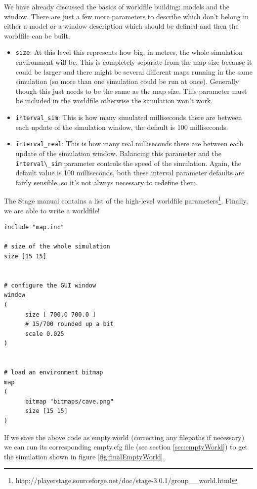 \documentclass[a4paper]{report}
\begin{document}
We have already discussed the basics of worldfile building: models and the window. There are just a few more parameters to describe which don't belong in either a model or a window description which should be defined and then the worldfile can be built.
\begin{itemize}
\item \verb|size|: At this level this represents how big, in metres, the whole simulation environment will be. This is completely separate from the map size because it could be larger and there might be several different maps running in the same simulation (so more than one simulation could be run at once). Generally though this just needs to be the same as the map size. This parameter must be included in the worldfile otherwise the simulation won't work.
\item \verb|interval_sim|: This is how many simulated milliseconds there are between each update of the simulation window, the default is 100 milliseconds.
\item \verb|interval_real|: This is how many real milliseconds there are between each update of the simulation window. Balancing this parameter and the \verb|interval\_sim| parameter controls the speed of the simulation. Again, the default value is 100 milliseconds, both these interval parameter defaults are fairly sensible, so it's not always necessary to redefine them.
\end{itemize}
The Stage manual contains a list of the high-level worldfile parameters\footnote{http://playerstage.sourceforge.net/doc/stage-3.0.1/group\_\_world.html}.\newline
Finally, we are able to write a worldfile!
\begin{verbatim}
include "map.inc"

# size of the whole simulation
size [15 15]


# configure the GUI window
window
( 
      size [ 700.0 700.0 ] 
      # 15/700 rounded up a bit
	  scale 0.025
)


# load an environment bitmap
map
(
      bitmap "bitmaps/cave.png"
      size [15 15]	
)
\end{verbatim}
If we save the above code as empty.world (correcting any filepaths if necessary) we can run its corresponding empty.cfg file (see section \ref{sec:emptyWorld}) to get the simulation shown in figure \ref{fig:finalEmptyWorld}.
\end{document}
